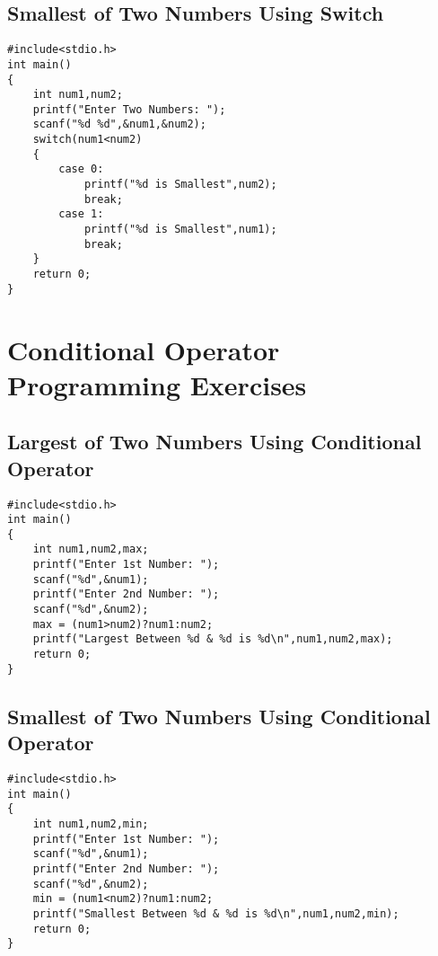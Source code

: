 \documentclass[a4paper,14pt]{article}
\begin{document}
\subsection{Smallest of Two Numbers Using Switch}
\vspace{0.5cm}
\begin{lstlisting}[caption={Smallest of Two Numbers Using Switch}]
#include<stdio.h>
int main()
{
    int num1,num2;
    printf("Enter Two Numbers: ");
    scanf("%d %d",&num1,&num2);
    switch(num1<num2)
    {
        case 0:
            printf("%d is Smallest",num2);
            break;
        case 1:
            printf("%d is Smallest",num1);
            break;
    }
    return 0;
}
\end{lstlisting}
\newpage


\section{Conditional Operator Programming Exercises}


\subsection{Largest of Two Numbers Using Conditional Operator}
\vspace{0.5cm}
\begin{lstlisting}[caption={Largest of Two Numbers Using Conditional Operator}]
#include<stdio.h>
int main()
{
    int num1,num2,max;
    printf("Enter 1st Number: ");
    scanf("%d",&num1);
    printf("Enter 2nd Number: ");
    scanf("%d",&num2);
    max = (num1>num2)?num1:num2;
    printf("Largest Between %d & %d is %d\n",num1,num2,max);
    return 0;
}
\end{lstlisting}
\newpage

\subsection{Smallest of Two Numbers Using Conditional Operator}
\vspace{0.5cm}
\begin{lstlisting}[caption={Smallest of Two Numbers Using Conditional Operator}]
#include<stdio.h>
int main()
{
    int num1,num2,min;
    printf("Enter 1st Number: ");
    scanf("%d",&num1);
    printf("Enter 2nd Number: ");
    scanf("%d",&num2);
    min = (num1<num2)?num1:num2;
    printf("Smallest Between %d & %d is %d\n",num1,num2,min);
    return 0;
}
\end{lstlisting}
\newpage
\end{document}
